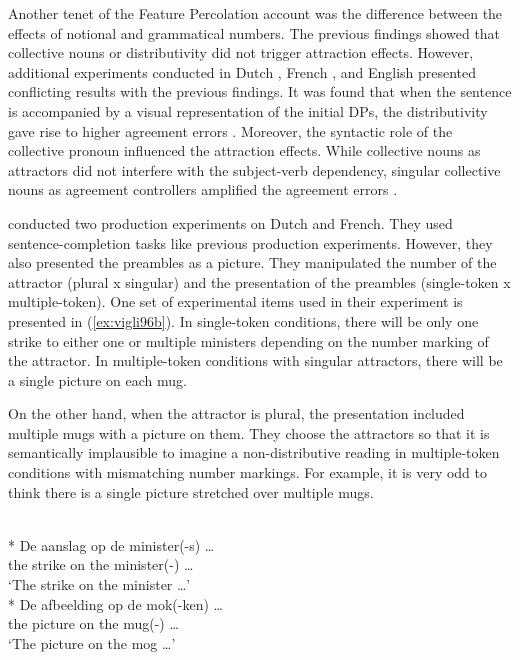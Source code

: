 Another tenet of the Feature Percolation account was the difference between the effects of notional and grammatical numbers. The previous findings showed that collective nouns or distributivity did not trigger attraction effects. However, additional experiments conducted in Dutch \citep{ViglioccoEtAl96b}, French \citep{ViglioccoEtAl96b}, and English \citep{HumphreysBock2005,HaskellMacDonald2003,Eberhard1999} presented conflicting results with the previous \cites{BockMiller:1991} findings. It was found that when the sentence is accompanied by a visual representation of the initial DPs, the distributivity gave rise to higher agreement errors \citep{ViglioccoEtAl96b}. Moreover, the syntactic role of the collective pronoun influenced the attraction effects. While collective nouns as attractors did not interfere with the subject-verb dependency, singular collective nouns as agreement controllers amplified the agreement errors \citep{HaskellMacDonald2003}.

 conducted two production experiments on Dutch and French. They used sentence-completion tasks like previous production experiments. However, they also presented the preambles as a picture. They manipulated the number of the attractor (plural x singular) and the presentation of the preambles (single-token x multiple-token). One set of experimental items used in their experiment is presented in (\ref{ex:vigli96b}). In single-token conditions, there will be only one strike to either one or multiple ministers depending on the number marking of the attractor. In multiple-token conditions with singular attractors, there will be a single picture on each mug. 

On the other hand, when the attractor is plural, the presentation included multiple mugs with a picture on them. They choose the attractors so that it is semantically implausible to imagine a non-distributive reading in multiple-token conditions with mismatching number markings. For example, it is very odd to think there is a single picture stretched over multiple mugs. 

\ea \label{ex:vigli96b}
   \label{ex:vigli96b-single}\\*
    \gll De {aanslag} op de {minister(-s)} \ldots{}\\
    the strike on the minister(-\Pl{}) \ldots{}\\
    \glt `The strike on the minister \ldots{}'
   \label{ex:vigli96b-multiple}\\*
    \gll De {afbeelding} op de {mok(-ken)} \ldots{} \\
    the picture on the mug(-\Pl{}) \ldots{} \\
    \glt `The picture on the mog \ldots{}'
  \z
\z


